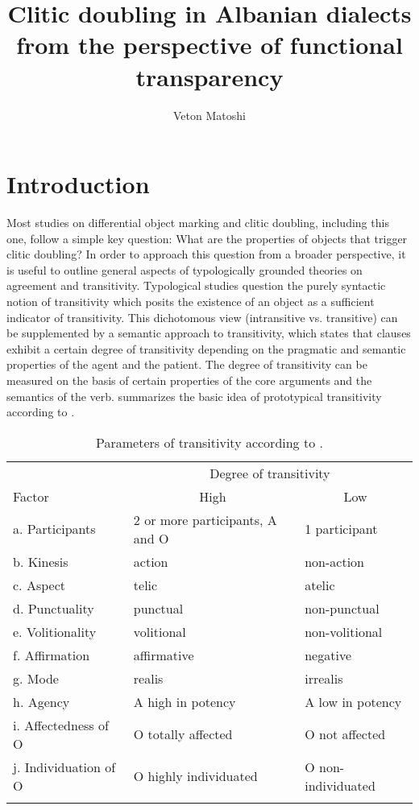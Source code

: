 \documentclass[output=paper]{langsci/langscibook}
\author{Veton Matoshi\affiliation{LMU Munich}}
\title[Clitic doubling in Albanian dialects]{Clitic doubling in Albanian dialects from the perspective of functional transparency}
\begin{document}
\maketitle

\section{Introduction}\label{sec:matoshi:1}

Most studies on differential object marking and clitic doubling, including this one, follow a simple key question: What are the properties of objects that trigger clitic doubling? In order to approach this question from a broader perspective, it is useful to outline general aspects of typologically grounded theories on agreement and transitivity. Typological studies question the purely syntactic notion of transitivity which posits the existence of an object as a sufficient indicator of transitivity. This dichotomous view (intransitive vs. transitive) can be supplemented by a semantic approach to transitivity, which states that clauses exhibit a certain degree of transitivity depending on the pragmatic and semantic properties of the agent and the patient. The degree of transitivity can be measured on the basis of certain properties of the core arguments and the semantics of the verb.  summarizes the basic idea of prototypical transitivity according to \citet{Hopper1980}.

\begin{table}
\begin{tabular}{lll}
\lsptoprule
                     & \multicolumn{2}{c}{Degree of transitivity} \\
\cmidrule(lr){2-3}
Factor               & \multicolumn{1}{c}{High} & \multicolumn{1}{c}{Low}\\
\midrule
a. Participants      & 2 or more participants, A and O & 1 participant\\
b. Kinesis           & action & non-action\\
c. Aspect            & telic & atelic\\
d. Punctuality       & punctual & non-punctual\\
e. Volitionality     & volitional & non-volitional\\
f. Affirmation       & affirmative & negative\\
g. Mode              & realis & irrealis\\
h. Agency            & A high in potency & A low in potency\\
i. Affectedness of O & O totally affected & O not affected\\
j. Individuation of O & O highly individuated & O non-individuated\\
\lspbottomrule
\end{tabular}
\caption{Parameters of transitivity according to \citet[252]{Hopper1980}.\label{tab:matoshi:1}}
\end{table}
\end{document}
